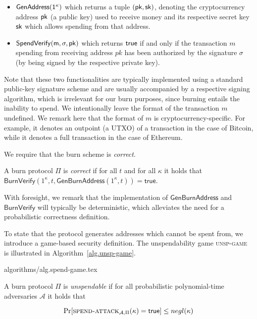 \begin{itemize}
  \item $\sf{GenAddress}(1^\kappa)$ which returns a tuple $(\sf{pk}, \sf{sk})$, denoting the cryptocurrency address $\sf{pk}$ (a public key) used to receive money and its respective secret key $\sf{sk}$ which allows spending from that address.

  \item $\sf{SpendVerify}(m, \sigma, pk)$ which returns $\sf{true}$ if and only if the transaction $m$ spending from receiving address $pk$ has been authorized by the signature $\sigma$ (by being signed by the respective private key).
\end{itemize}

Note that these two functionalities are typically implemented using a standard public-key signature scheme and are usually accompanied by a respective signing algorithm, which is irrelevant for our burn purposes, since burning entails the inability to spend. We intentionally leave the format of the transaction $m$ undefined. We remark here that the format of $m$ is cryptocurrency-specific. For example, it denotes an outpoint (a UTXO) of a transaction in the case of Bitcoin, while it denotes a full transaction in the case of Ethereum.

We require that the burn scheme is \emph{correct}.

\begin{definition}[Correctness]
  A burn protocol $\Pi$ is \emph{correct} if for all $t$ and for all $\kappa$ it holds that
  $\mathsf{BurnVerify}(1^\kappa, t, \mathsf{GenBurnAddress}(1^\kappa, t)) = \textsf{true}$.
\end{definition}

With foresight, we remark that the implementation of $\mathsf{GenBurnAddress}$ and $\mathsf{BurnVerify}$ will typically be deterministic, which alleviates the need for a probabilistic correctness definition.

To state that the protocol generates addresses which cannot be spent from, we introduce a game-based security definition. The unspendability game \textsc{unsp-game} is illustrated in Algorithm~\ref{alg.unsp-game}.

{algorithms/alg.spend-game.tex}

\begin{definition}[Unspendability]
  A burn protocol $\Pi$ is \emph{unspendable} if
  for all probabilistic polynomial-time adversaries $\mathcal{A}$
  it holds that

  \[
    \Pr[\textsc{spend-attack}_{\mathcal{A},
    \Pi}(\kappa) = \textsf{true}] \leq negl(\kappa)
  \]
\end{definition}

